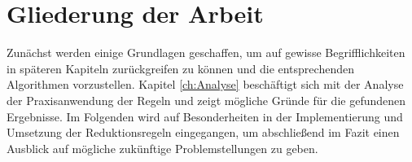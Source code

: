\section{Gliederung der Arbeit}
\label{ch:Einleitung:sec:Gliederung}

Zunächst werden einige Grundlagen geschaffen, um auf gewisse Begrifflichkeiten in späteren Kapiteln zurückgreifen zu können und die entsprechenden Algorithmen vorzustellen. Kapitel \ref{ch:Analyse} beschäftigt sich mit der Analyse der Praxisanwendung der Regeln und zeigt mögliche Gründe für die gefundenen Ergebnisse. Im Folgenden wird auf Besonderheiten in der Implementierung und Umsetzung der Reduktionsregeln eingegangen, um abschließend im Fazit einen Ausblick auf mögliche zukünftige Problemstellungen zu geben.



